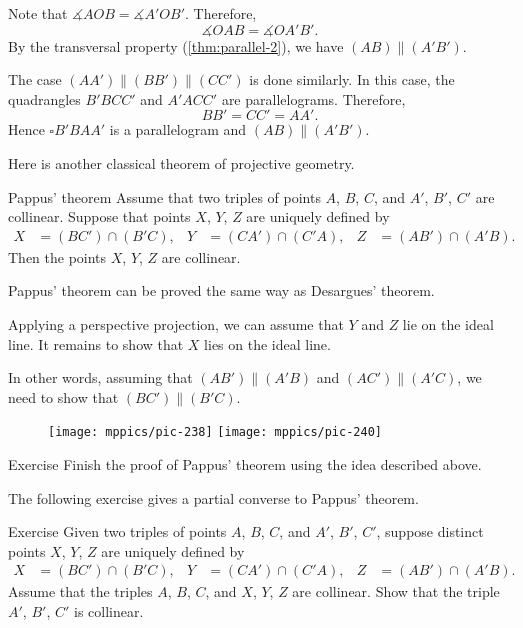 Note that $\measuredangle AOB=\measuredangle A'OB'$.
Therefore, 
\[\measuredangle OAB=\measuredangle OA'B'.\]
By the transversal property (\ref{thm:parallel-2}), we have
$(AB)\parallel (A'B')$.

The case $(AA')\parallel(BB')\parallel(CC')$ is done similarly.
In this case, the quadrangles $B'BCC'$ and $A'ACC'$ are parallelograms.
Therefore, 
\[BB'=CC'=AA'.\]
Hence $\square B'BAA'$ is a parallelogram and $(AB)\parallel (A'B')$.
\qeds

Here is another classical theorem of projective geometry.

\begin{thm}{Pappus' theorem}\label{thm:pappus}
Assume that two triples of points $A$, $B$, $C$,
and $A'$, $B'$, $C'$ are collinear.
Suppose that points $X$, $Y$, $Z$ are uniquely defined by
\begin{align*}
X&=(BC')\cap(B'C),
&
Y&=(CA')\cap(C'A),
&
Z&=(AB')\cap(A'B).
\end{align*}
Then the points $X$, $Y$, $Z$ are collinear.
\end{thm}

Pappus' theorem can be proved the same way as Desargues' theorem.

Applying a perspective projection, we can assume that $Y$ and $Z$ lie on the ideal line.
It remains to show that $X$ lies on the ideal line.

In other words, assuming that $(AB')\parallel (A'B)$ and $(AC')\parallel (A'C)$, we need to show that $(BC')\parallel(B'C)$.

\begin{figure}[!ht]
\centering
\texttt{[image: mppics/pic-238]}
\hskip15mm
\texttt{[image: mppics/pic-240]}
\end{figure}


\begin{thm}{Exercise}\label{ex:pappus}
Finish the proof of Pappus' theorem using the idea described above.
\end{thm}

The following exercise gives a partial converse to Pappus' theorem.

\begin{thm}{Exercise}\label{ex:pappus-converse}
Given two triples of points $A$, $B$, $C$,
and $A'$, $B'$, $C'$,
suppose distinct points $X$, $Y$, $Z$ are uniquely defined by
\begin{align*}
X&=(BC')\cap(B'C),
&
Y&=(CA')\cap(C'A),
&
Z&=(AB')\cap(A'B).
\end{align*}
Assume that the triples $A$, $B$, $C$,
and $X$, $Y$, $Z$ are collinear.
Show that the triple $A'$, $B'$, $C'$ is collinear.
\end{thm}

